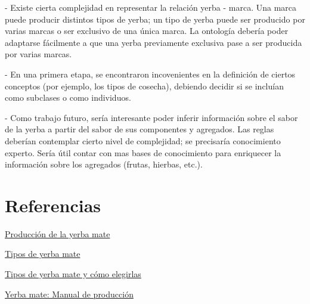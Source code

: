 \documentclass[12pt]{report}
\theoremstyle{plain} %
\begin{document}
- Existe cierta complejidad en representar la relación yerba - marca. Una marca puede producir distintos tipos de yerba; un tipo de yerba puede ser producido por varias marcas o ser exclusivo de una única marca. La ontología debería poder adaptarse fácilmente a que una yerba previamente exclusiva pase a ser producida por varias marcas.

- En una primera etapa, se encontraron incovenientes en la definición de ciertos conceptos (por ejemplo, los tipos de cosecha), debiendo decidir si se incluían como subclases o como individuos.

- Como trabajo futuro, sería interesante poder inferir información sobre el sabor de la yerba a partir del sabor de sus componentes y agregados. Las reglas deberían contemplar cierto nivel de complejidad; se precisaría conocimiento experto. Sería útil contar con mas bases de conocimiento para enriquecer la información sobre los agregados (frutas, hierbas, etc.).

\section*{Referencias}

\href{https://www.taragui.com/aprender/historia/produccion-de-la-yerba-mate}{Producción de la yerba mate}

\href{https://www.mateologist.com/tipos-de-yerba-mate/}{Tipos de yerba mate}

\href{https://yerbamateargentina.org.ar/es/noticias/consejos-materos/79020-tipos-de-yerba-mate-y-como-elegirlas.html}{Tipos de yerba mate y cómo elegirlas}

\href{https://inym.org.ar/descargar.html?archivo=enR1K1ZxRDB1czZKeW80L01ZYVpJZz09}{Yerba mate: Manual de producción}
\end{document}
